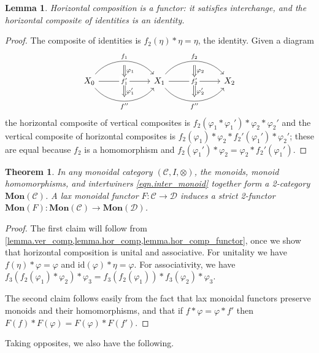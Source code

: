 \documentclass[11pt, one side, article]{memoir}
\theoremstyle{definition}
\theoremstyle{plain}
\newtheorem{theorem}[definitionx]{Theorem}
\newtheorem{lemma}[definitionx]{Lemma}
\newcommand{\cat}[1]{\mathcal{#1}}%
\newcommand{\Cat}[1]{\mathbf{#1}}%
\newcommand{\id}{\mathrm{id}}
\newcommand{\0}{\textsf{0}}
\newcommand{\1}{\tn{\textsf{1}}}
\begin{document}
\begin{lemma}\label{lemma.hor_comp_functor}
Horizontal composition is a functor: it satisfies interchange, and the horizontal composite of identities is an identity.
\end{lemma}
\begin{proof}
The composite of identities is $f_2(\eta)*\eta=\eta$, the identity. Given a diagram
\[
\begin{tikzcd}[column sep=60pt]
	X_0\ar[r, bend left=50pt, "f_1", ""' name=a1]\ar[r, "f_1'" description, "" name=b11, ""' name=b12]\ar[r, bend right=50pt, "f''"', "" name=c1]&
	X_1\ar[r, bend left=50pt, "f_2", ""' name=a2]\ar[r, "f_2'" description, "" name=b21, ""' name=b22]\ar[r, bend right=50pt, "f''"', "" name=c2]&
	X_2
	\ar[from=a1, to=b11, Rightarrow, "\varphi_1"]
	\ar[from=b12, to=c1, Rightarrow, "\varphi_1'"]
	\ar[from=a2, to=b21, Rightarrow, "\varphi_2"]
	\ar[from=b22, to=c2, Rightarrow, "\varphi_2'"]
\end{tikzcd}
\]
the horizontal composite of vertical composites is $f_2(\varphi_1*\varphi_1')*\varphi_2*\varphi_2'$ and the vertical composite of horizontal composites is $f_2(\varphi_1)*\varphi_2*f_2'(\varphi_1')*\varphi_2'$; these are equal because $f_2$ is a homomorphism and $f_2(\varphi_1')*\varphi_2=\varphi_2*f_2'(\varphi_1')$.
\end{proof}

\begin{theorem}\label{thm.main}
In any monoidal category $(\cat{C},I,\otimes)$, the monoids, monoid homomorphisms, and intertwiners \eqref{eqn.inter_monoid} together form a 2-category $\Cat{Mon}(\cat{C})$. A lax monoidal functor $F\colon\cat{C}\to\cat{D}$ induces a strict 2-functor $\Cat{Mon}(F)\colon\Cat{Mon}(\cat{C})\to\Cat{Mon}(\cat{D})$.
\end{theorem}
\begin{proof}
The first claim will follow from \cref{lemma.ver_comp,lemma.hor_comp,lemma.hor_comp_functor}, once we show that horizontal composition is unital and associative. For unitality we have $f(\eta)*\varphi=\varphi$ and $\id(\varphi)*\eta=\varphi$. For associativity, we have $f_3(f_2(\varphi_1)*\varphi_2)*\varphi_3=f_3(f_2(\varphi_1))*f_3(\varphi_2)*\varphi_3$.

The second claim follows easily from the fact that lax monoidal functors preserve monoids and their homomorphisms, and that if $f*\varphi=\varphi*f'$ then $F(f)*F(\varphi)=F(\varphi)*F(f')$.
\end{proof}

Taking opposites, we also have the following.
\end{document}
